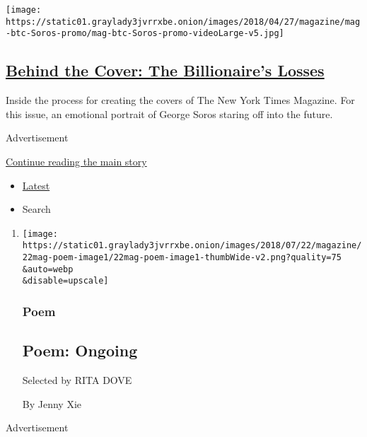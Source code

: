 \begin{enumerate}
  \texttt{[image: https://static01.graylady3jvrrxbe.onion/images/2018/04/27/magazine/mag-btc-Soros-promo/mag-btc-Soros-promo-videoLarge-v5.jpg]}

  \hypertarget{behind-the-cover-the-billionaires-losses}{%
  \subsection{\texorpdfstring{\href{/2018/07/18/magazine/behind-the-cover-the-billionaires-losses.html}{Behind
  the Cover: The Billionaire's
  Losses}}{Behind the Cover: The Billionaire's Losses}}\label{behind-the-cover-the-billionaires-losses}}

  Inside the process for creating the covers of The New York Times
  Magazine. For this issue, an emotional portrait of George Soros
  staring off into the future.
\end{enumerate}

Advertisement

\protect\hyperlink{after-mid1}{Continue reading the main story}

\begin{itemize}
\tightlist
\item
  \protect\hyperlink{stream-panel}{Latest}
\item
  Search
\end{itemize}

\begin{enumerate}
\def\labelenumi{\arabic{enumi}.}
\item
  \href{/2018/07/19/magazine/poem-ongoing.html}{}

  \texttt{[image: https://static01.graylady3jvrrxbe.onion/images/2018/07/22/magazine/22mag-poem-image1/22mag-poem-image1-thumbWide-v2.png?quality=75\\\&auto=webp\\\&disable=upscale]}

  \hypertarget{poem}{%
  \subsubsection{Poem}\label{poem}}

  \hypertarget{poem-ongoing}{%
  \subsection{Poem: Ongoing}\label{poem-ongoing}}

  Selected by RITA DOVE

  By Jenny Xie
\end{enumerate}

Advertisement

